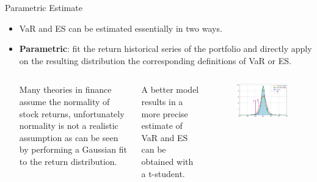 \documentclass{beamer}
\begin{document}
\begin{frame}{Parametric Estimate}
  \begin{itemize}
  \item VaR and ES can be estimated essentially in two ways.
  \item \textbf{Parametric}: fit the return historical series of the portfolio and directly apply on the resulting distribution the corresponding definitions of VaR or ES.
    \begin{columns}
      Many theories in finance assume the normality of stock returns, unfortunately normality is not a realistic assumption as can be seen by performing a Gaussian fit to the return distribution.
      
      A better model results in a more precise estimate of VaR and ES can be obtained with a t-student.
      \begin{figure}[h]
        \begin{center}
          \includegraphics[width=0.9\linewidth]{parametric_var}
        \end{center}
      \end{figure}
    \end{columns}
  \end{itemize}
\end{frame}
\end{document}
